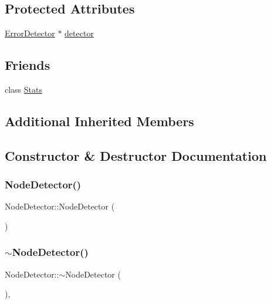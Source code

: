 \subsection*{Protected Attributes}
\begin{DoxyCompactItemize}
\item 
\hyperlink{classErrorDetector}{Error\+Detector} $\ast$ \hyperlink{classNodeDetector_a711fd643dc29b74e6dfe87e1aeb1b227}{detector}
\end{DoxyCompactItemize}
\subsection*{Friends}
\begin{DoxyCompactItemize}
\item 
class \hyperlink{classNodeDetector_a129f65b6976377739eb6231b6962985e}{Stats}
\end{DoxyCompactItemize}
\subsection*{Additional Inherited Members}


\subsection{Constructor \& Destructor Documentation}
\mbox{\label{classNodeDetector_a256160d034631f4fa14a83787f504aae}} 
\subsubsection{\texorpdfstring{Node\+Detector()}{NodeDetector()}}
{\footnotesize\ttfamily Node\+Detector\+::\+Node\+Detector (\begin{DoxyParamCaption}{ }\end{DoxyParamCaption})\hspace{0.3cm}{\ttfamily [protected]}}

\mbox{\label{classNodeDetector_a3f8e6eedfce05ea8953ff1a41413ccfa}} 
\subsubsection{\texorpdfstring{$\sim$\+Node\+Detector()}{~NodeDetector()}}
{\footnotesize\ttfamily Node\+Detector\+::$\sim$\+Node\+Detector (\begin{DoxyParamCaption}{ }\end{DoxyParamCaption})\hspace{0.3cm}{\ttfamily [protected]}, {\ttfamily [virtual]}}



